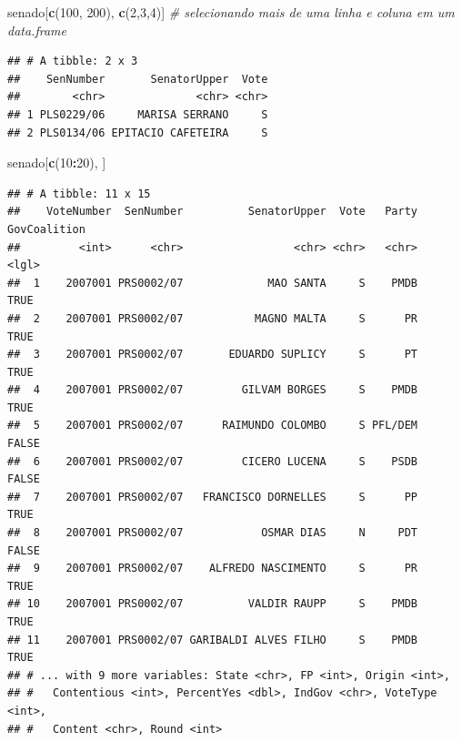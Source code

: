 \documentclass[]{book}
\newenvironment{Shaded}{\begin{snugshade}}{\end{snugshade}}
\newcommand{\KeywordTok}[1]{\textcolor[rgb]{0.13,0.29,0.53}{\textbf{#1}}}
\newcommand{\DecValTok}[1]{\textcolor[rgb]{0.00,0.00,0.81}{#1}}
\newcommand{\CommentTok}[1]{\textcolor[rgb]{0.56,0.35,0.01}{\textit{#1}}}
\newcommand{\OperatorTok}[1]{\textcolor[rgb]{0.81,0.36,0.00}{\textbf{#1}}}
\newcommand{\NormalTok}[1]{#1}
\begin{document}
\begin{Shaded}
\begin{Highlighting}[]
\NormalTok{senado[}\KeywordTok{c}\NormalTok{(}\DecValTok{100}\NormalTok{, }\DecValTok{200}\NormalTok{), }\KeywordTok{c}\NormalTok{(}\DecValTok{2}\NormalTok{,}\DecValTok{3}\NormalTok{,}\DecValTok{4}\NormalTok{)] }\CommentTok{# selecionando mais de uma linha e coluna em um data.frame}
\end{Highlighting}
\end{Shaded}

\begin{verbatim}
## # A tibble: 2 x 3
##    SenNumber       SenatorUpper  Vote
##        <chr>              <chr> <chr>
## 1 PLS0229/06     MARISA SERRANO     S
## 2 PLS0134/06 EPITACIO CAFETEIRA     S
\end{verbatim}

\begin{Shaded}
\begin{Highlighting}[]
\NormalTok{senado[}\KeywordTok{c}\NormalTok{(}\DecValTok{10}\OperatorTok{:}\DecValTok{20}\NormalTok{), ]}
\end{Highlighting}
\end{Shaded}

\begin{verbatim}
## # A tibble: 11 x 15
##    VoteNumber  SenNumber          SenatorUpper  Vote   Party GovCoalition
##         <int>      <chr>                 <chr> <chr>   <chr>        <lgl>
##  1    2007001 PRS0002/07             MAO SANTA     S    PMDB         TRUE
##  2    2007001 PRS0002/07           MAGNO MALTA     S      PR         TRUE
##  3    2007001 PRS0002/07       EDUARDO SUPLICY     S      PT         TRUE
##  4    2007001 PRS0002/07         GILVAM BORGES     S    PMDB         TRUE
##  5    2007001 PRS0002/07      RAIMUNDO COLOMBO     S PFL/DEM        FALSE
##  6    2007001 PRS0002/07         CICERO LUCENA     S    PSDB        FALSE
##  7    2007001 PRS0002/07   FRANCISCO DORNELLES     S      PP         TRUE
##  8    2007001 PRS0002/07            OSMAR DIAS     N     PDT        FALSE
##  9    2007001 PRS0002/07    ALFREDO NASCIMENTO     S      PR         TRUE
## 10    2007001 PRS0002/07          VALDIR RAUPP     S    PMDB         TRUE
## 11    2007001 PRS0002/07 GARIBALDI ALVES FILHO     S    PMDB         TRUE
## # ... with 9 more variables: State <chr>, FP <int>, Origin <int>,
## #   Contentious <int>, PercentYes <dbl>, IndGov <chr>, VoteType <int>,
## #   Content <chr>, Round <int>
\end{verbatim}
\end{document}
